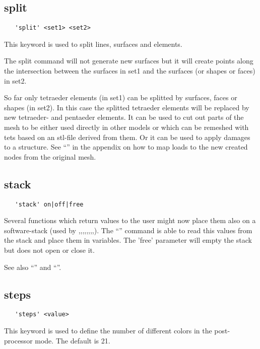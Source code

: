 \documentclass{article}
\begin{document}
\subsection{\label{split}split}
\begin{verbatim}
   'split' <set1> <set2> 
\end{verbatim}
This keyword is used to split lines, surfaces and elements.

The split command will not generate new surfaces but it will create points along the intersection between the surfaces in set1 and the surfaces (or shapes or faces) in set2.

So far only tetraeder elements (in set1) can be splitted by surfaces, faces or shapes (in set2). In this case the splitted tetraeder elements will be replaced by new tetraeder- and pentaeder elements. It can be used to cut out parts of the mesh to be either used directly in other models or which can be remeshed with tets based on an stl-file derived from them. Or it can be used to apply damages to a structure. See ``'' in the appendix on how to map loads to the new created nodes from the original mesh.

\subsection{\label{stack}stack}
\begin{verbatim}
   'stack' on|off|free
\end{verbatim}
Several functions which return values to the user might now place them also on a software-stack (used by ,,,,,,,,). The ``'' command is able to read this values from the stack and place them in variables. The 'free' parameter will empty the stack but does not open or close it.

See also ``'' and ``''.

\subsection{\label{steps}steps}
\begin{verbatim}
   'steps' <value> 
\end{verbatim}
This keyword is used to define the number of different colors in the post-processor mode. The default is 21.
\end{document}
